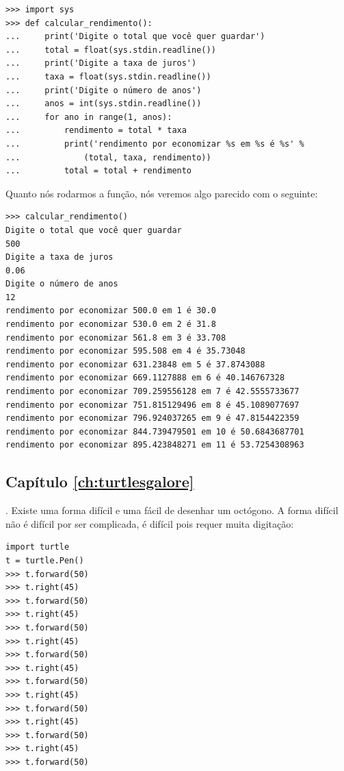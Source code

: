 \begin{listing}
\begin{verbatim}
>>> import sys
>>> def calcular_rendimento():
...     print('Digite o total que você quer guardar')
...     total = float(sys.stdin.readline())
...     print('Digite a taxa de juros')
...     taxa = float(sys.stdin.readline())
...     print('Digite o número de anos')
...     anos = int(sys.stdin.readline())
...     for ano in range(1, anos):
...         rendimento = total * taxa
...         print('rendimento por economizar %s em %s é %s' % 
...             (total, taxa, rendimento))
...         total = total + rendimento
\end{verbatim}
\end{listing}

\noindent
Quanto nós rodarmos a função, nós veremos algo parecido com o seguinte:

\begin{listingignore}
\begin{verbatim}
>>> calcular_rendimento()
Digite o total que você quer guardar
500
Digite a taxa de juros
0.06
Digite o número de anos
12
rendimento por economizar 500.0 em 1 é 30.0
rendimento por economizar 530.0 em 2 é 31.8
rendimento por economizar 561.8 em 3 é 33.708
rendimento por economizar 595.508 em 4 é 35.73048
rendimento por economizar 631.23848 em 5 é 37.8743088
rendimento por economizar 669.1127888 em 6 é 40.146767328
rendimento por economizar 709.259556128 em 7 é 42.5555733677
rendimento por economizar 751.815129496 em 8 é 45.1089077697
rendimento por economizar 796.924037265 em 9 é 47.8154422359
rendimento por economizar 844.739479501 em 10 é 50.6843687701
rendimento por economizar 895.423848271 em 11 é 53.7254308963
\end{verbatim}
\end{listingignore}

\subsection*{Capítulo \ref{ch:turtlesgalore}}

. Existe uma forma difícil e uma fácil de desenhar um octógono. A forma difícil não é difícil por ser complicada, é difícil pois requer muita digitação:

\begin{listing}
\begin{verbatim}
import turtle
t = turtle.Pen()
>>> t.forward(50)
>>> t.right(45)
>>> t.forward(50)
>>> t.right(45)
>>> t.forward(50)
>>> t.right(45)
>>> t.forward(50)
>>> t.right(45)
>>> t.forward(50)
>>> t.right(45)
>>> t.forward(50)
>>> t.right(45)
>>> t.forward(50)
>>> t.right(45)
>>> t.forward(50)
\end{verbatim}
\end{listing}

